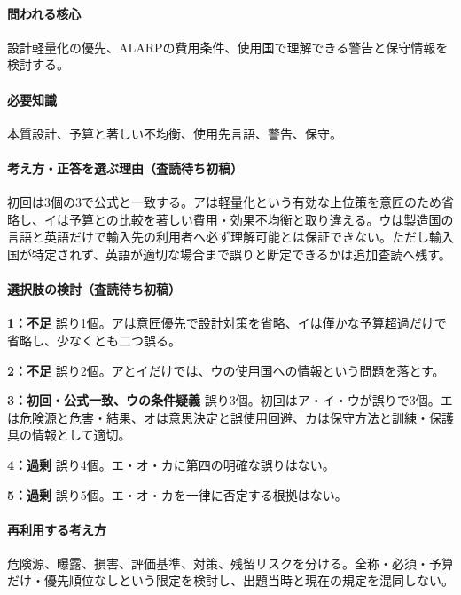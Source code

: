 \paragraph{問われる核心} 設計軽量化の優先、ALARPの費用条件、使用国で理解できる警告と保守情報を検討する。

\paragraph{必要知識} 本質設計、予算と著しい不均衡、使用先言語、警告、保守。

\paragraph{考え方・正答を選ぶ理由（査読待ち初稿）} 初回は3個の3で公式と一致する。アは軽量化という有効な上位策を意匠のため省略し、イは予算との比較を著しい費用・効果不均衡と取り違える。ウは製造国の言語と英語だけで輸入先の利用者へ必ず理解可能とは保証できない。ただし輸入国が特定されず、英語が適切な場合まで誤りと断定できるかは追加査読へ残す。

\paragraph{選択肢の検討（査読待ち初稿）}\mbox{}\par

\noindent\textbf{1：不足} 誤り1個。アは意匠優先で設計対策を省略、イは僅かな予算超過だけで省略し、少なくとも二つ誤る。\par

\noindent\textbf{2：不足} 誤り2個。アとイだけでは、ウの使用国への情報という問題を落とす。\par

\noindent\textbf{3：初回・公式一致、ウの条件疑義} 誤り3個。初回はア・イ・ウが誤りで3個。エは危険源と危害・結果、オは意思決定と誤使用回避、カは保守方法と訓練・保護具の情報として適切。\par

\noindent\textbf{4：過剰} 誤り4個。エ・オ・カに第四の明確な誤りはない。\par

\noindent\textbf{5：過剰} 誤り5個。エ・オ・カを一律に否定する根拠はない。\par

\paragraph{再利用する考え方} 危険源、曝露、損害、評価基準、対策、残留リスクを分ける。全称・必須・予算だけ・優先順位なしという限定を検討し、出題当時と現在の規定を混同しない。

